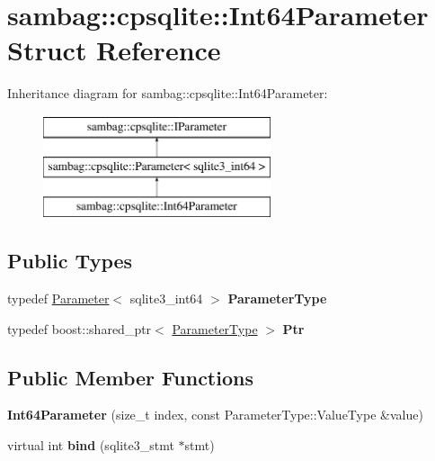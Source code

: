 \hypertarget{structsambag_1_1cpsqlite_1_1_int64_parameter}{
\section{sambag::cpsqlite::Int64Parameter Struct Reference}
\label{structsambag_1_1cpsqlite_1_1_int64_parameter}
}
Inheritance diagram for sambag::cpsqlite::Int64Parameter:\begin{figure}[H]
\begin{center}
\leavevmode
\includegraphics[height=3.000000cm]{structsambag_1_1cpsqlite_1_1_int64_parameter}
\end{center}
\end{figure}
\subsection*{Public Types}
\begin{DoxyCompactItemize}
\item 
\hypertarget{structsambag_1_1cpsqlite_1_1_int64_parameter_ad8a0736667756990ba60fe714d1e03fa}{
typedef \hyperlink{structsambag_1_1cpsqlite_1_1_parameter}{Parameter}$<$ sqlite3\_\-int64 $>$ {\bfseries ParameterType}}
\label{structsambag_1_1cpsqlite_1_1_int64_parameter_ad8a0736667756990ba60fe714d1e03fa}

\item 
\hypertarget{structsambag_1_1cpsqlite_1_1_int64_parameter_a49ab9d9d8b561f6771a21371ee8a9d9f}{
typedef boost::shared\_\-ptr$<$ \hyperlink{structsambag_1_1cpsqlite_1_1_parameter}{ParameterType} $>$ {\bfseries Ptr}}
\label{structsambag_1_1cpsqlite_1_1_int64_parameter_a49ab9d9d8b561f6771a21371ee8a9d9f}

\end{DoxyCompactItemize}
\subsection*{Public Member Functions}
\begin{DoxyCompactItemize}
\item 
\hypertarget{structsambag_1_1cpsqlite_1_1_int64_parameter_af28767be1ef88ba93ecea24e7ca0a806}{
{\bfseries Int64Parameter} (size\_\-t index, const ParameterType::ValueType \&value)}
\label{structsambag_1_1cpsqlite_1_1_int64_parameter_af28767be1ef88ba93ecea24e7ca0a806}

\item 
\hypertarget{structsambag_1_1cpsqlite_1_1_int64_parameter_acb786511cccad045d265e59c622fc401}{
virtual int {\bfseries bind} (sqlite3\_\-stmt $\ast$stmt)}
\label{structsambag_1_1cpsqlite_1_1_int64_parameter_acb786511cccad045d265e59c622fc401}

\end{DoxyCompactItemize}
